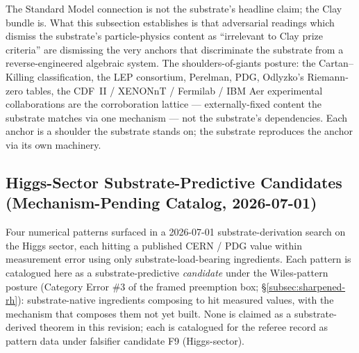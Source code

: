 \documentclass[11pt,a4paper]{amsart}
\theoremstyle{plain}
\theoremstyle{definition}
\begin{document}
The Standard Model connection is not the substrate's headline claim; the Clay bundle is. What this subsection establishes is that adversarial readings which dismiss the substrate's particle-physics content as ``irrelevant to Clay prize criteria'' are dismissing the very anchors that discriminate the substrate from a reverse-engineered algebraic system. The shoulders-of-giants posture: the Cartan--Killing classification, the LEP consortium, Perelman, PDG, Odlyzko's Riemann-zero tables, the CDF~II / XENONnT / Fermilab / IBM Aer experimental collaborations are the corroboration lattice --- externally-fixed content the substrate matches via one mechanism --- not the substrate's dependencies. Each anchor is a shoulder the substrate stands on; the substrate reproduces the anchor via its own machinery.

\subsection{Higgs-Sector Substrate-Predictive Candidates (Mechanism-Pending Catalog, 2026-07-01)}\label{subsec:higgs-sector-candidates}

Four numerical patterns surfaced in a 2026-07-01 substrate-derivation search on the Higgs sector, each hitting a published CERN / PDG value within measurement error using only substrate-load-bearing ingredients. Each pattern is catalogued here as a substrate-predictive \emph{candidate} under the Wiles-pattern posture (Category Error \#3 of the framed preemption box; \S\ref{subsec:sharpened-rh}): substrate-native ingredients composing to hit measured values, with the mechanism that composes them not yet built. None is claimed as a substrate-derived theorem in this revision; each is catalogued for the referee record as pattern data under falsifier candidate F9 (Higgs-sector).
\end{document}

